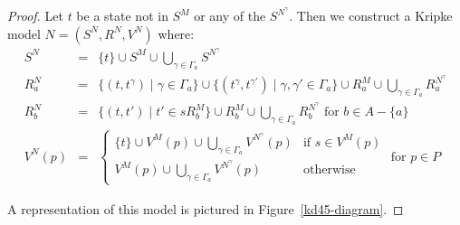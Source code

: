\begin{proof}
Let $t$ be a state not in $S^M$ or any of the $S^{N^\gamma}$.  Then we construct
a Kripke model $N = (S^N, R^N, V^N)$ where:
\begin{eqnarray*}
S^N &=& \{t\} \cup S^M \cup \bigcup_{\gamma \in \Gamma_a} S^{N^\gamma}\\
R^N_a &=& \{(t, t^\gamma) \mid \gamma \in \Gamma_a\} 
\cup \{(t^\gamma, t^{\gamma'}) \mid \gamma, \gamma' \in \Gamma_a\} 
\cup R^M_a
\cup \bigcup_{\gamma \in \Gamma_a} R^{N^\gamma}_a\\
R^N_b &=& \{(t, t') \mid t' \in sR^M_b\}
\cup R^M_b
\cup \bigcup_{\gamma \in \Gamma_a} R^{N^\gamma}_b \text{ for $b \in A - \{a\}$}\\
V^N(p) &=& 
\begin{cases}
\displaystyle \{t\} \cup V^M(p) \cup \bigcup_{\gamma \in \Gamma_a}
V^{N^\gamma}(p) & \text{if $s \in V^M(p)$}\\
\displaystyle V^M(p) \cup \bigcup_{\gamma \in \Gamma_a} V^{N^\gamma}(p) &
\text{otherwise}
\end{cases}
\text{ for $p \in P$}
\end{eqnarray*}

A representation of this model is pictured in Figure~\ref{kd45-diagram}.


\end{proof}
